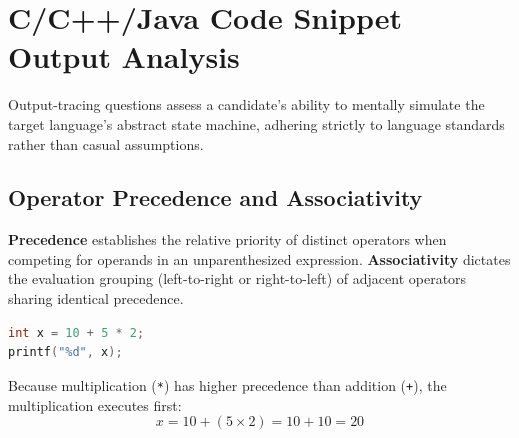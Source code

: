 \section{C/C++/Java Code Snippet Output Analysis}
\label{sec:code_snippet_output_analysis}

Output-tracing questions assess a candidate's ability to mentally simulate the target language's abstract state machine, adhering strictly to language standards rather than casual assumptions.

\subsection{Operator Precedence and Associativity}
\textbf{Precedence} establishes the relative priority of distinct operators when competing for operands in an unparenthesized expression. \textbf{Associativity} dictates the evaluation grouping (left-to-right or right-to-left) of adjacent operators sharing identical precedence.

\begin{lstlisting}[language=C]
int x = 10 + 5 * 2;
printf("%d", x);
\end{lstlisting}

Because multiplication (\texttt{*}) has higher precedence than addition (\texttt{+}), the multiplication executes first:
\[
x = 10 + (5 \times 2) = 10 + 10 = 20
\]


